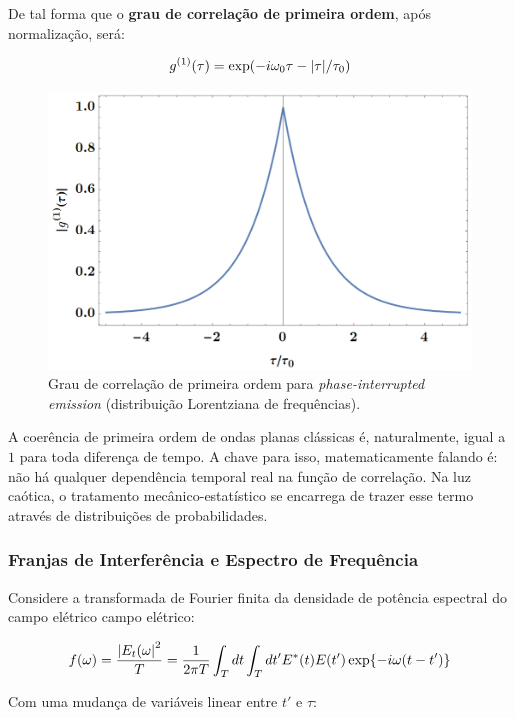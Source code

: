 \documentclass[12pt,a4paper]{report}
\begin{document}
De tal forma que o \textbf{grau de correlação de primeira ordem}, após normalização, será:

\begin{equation*}
    g^{(1)}(\tau)=\exp(-i\omega_0\tau-\abs{\tau}/\tau_0)
\end{equation*}

\begin{figure}[H]
    \centering
    \includegraphics[width=0.75\linewidth]{degree of first order coherence phase interrupted emission.png}
    \caption{Grau de correlação de primeira ordem para \textit{phase-interrupted emission} (distribuição Lorentziana de frequências).}
    \label{degree.first.order.coherence.lorentz}
\end{figure}

A coerência de primeira ordem de ondas planas clássicas é, naturalmente, igual a $1$ para toda diferença de tempo. A chave para isso, matematicamente falando é: não há qualquer dependência temporal real na função de correlação. Na luz caótica, o tratamento mecânico-estatístico se encarrega de trazer esse termo através de distribuições de probabilidades.

\subsubsection{Franjas de Interferência e Espectro de Frequência}

Considere a transformada de Fourier finita da densidade de potência espectral do campo elétrico campo elétrico:

\begin{equation}
    f(\omega)=\frac{\abs{E_t(\omega}^2}{T}=\frac{1}{2\pi T}\int_T{dt}\int_T{dt' E^*(t)E(t')\exp{-i\omega(t-t')}}
\end{equation}

Com uma mudança de variáveis linear entre $t'$ e $\tau$:
\end{document}
